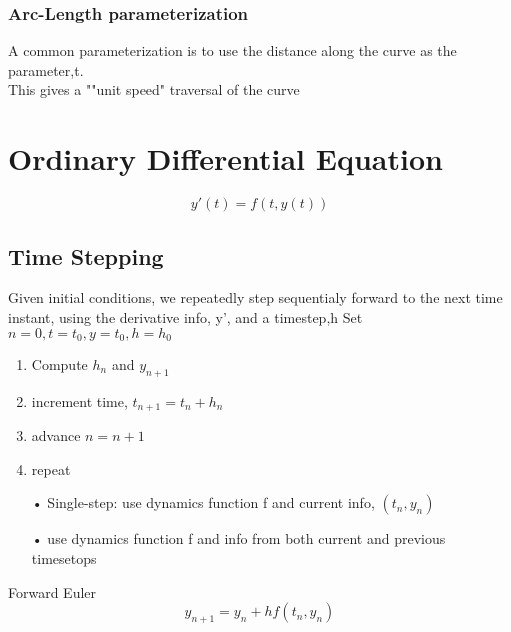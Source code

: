 \documentclass[10pt,usletter]{article}
\begin{document}
\subsubsection{Arc-Length parameterization}
A common parameterization is to use the distance along the curve as the parameter,t.\\
This gives a ""unit speed" traversal of the curve

\section{Ordinary Differential Equation}

$$y'(t)=f(t,y(t))$$

\subsection{Time Stepping}
Given initial conditions, we repeatedly step sequentialy forward to the next time instant, using the derivative info, y', and a timestep,h
Set $n=0,t=t_0,y=t_0,h=h_0$
\begin{enumerate}
\item Compute $h_n$ and $y_{n+1}$\\
\item increment time, $t_{n+1}=t_n+h_n$\\
\item advance $n=n+1$\\
\item repeat
\end{enumerate}

\begin{enumerate}
\item[•] Single-step: use dynamics function f and current info, $(t_n,y_n)$\\
\item[•] use dynamics function f and info from both current and previous timesetops
\end{enumerate}

Forward Euler
$$y_{n+1}=y_n+hf(t_n,y_n)$$
\end{document}
